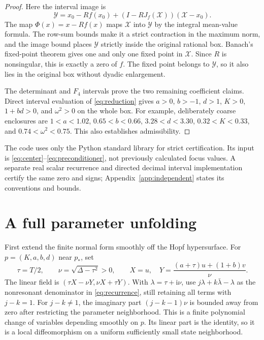 \documentclass[11pt,a4paper]{article}
\theoremstyle{remark}
\newcommand{\ii}{\mathrm i}
\numberwithin{equation}{section}
\begin{document}
\begin{proof}
Here the interval image is
\begin{equation}\label{eq:image}
 \mathcal Y=x_0-Rf(x_0)
                  +(I-RJ_f(\mathcal X))(\mathcal X-x_0).
\end{equation}
The map $\Phi(x)=x-Rf(x)$ maps $\mathcal X$ into $\mathcal Y$ by
the integral mean-value formula. The row-sum bounds make it a strict
contraction in the maximum norm, and the image bound places
$\mathcal Y$ strictly inside the original rational box. Banach's
fixed-point theorem gives one and only one fixed point in $\mathcal X$.
Since $R$ is nonsingular, this is exactly a zero of $f$. The fixed point
belongs to $\mathcal Y$, so it also lies in the original box without
dyadic enlargement.

The determinant and $F_4$ intervals prove the two remaining coefficient
claims. Direct interval evaluation of \eqref{eq:reduction} gives
$a>0$, $b>-1$, $d>1$, $K>0$, $1+bd>0$, and $\omega^2>0$ on the
whole box. For example, deliberately coarse enclosures are
$1<a<1.02$, $0.65<b<0.66$, $3.28<d<3.30$, $0.32<K<0.33$,
and $0.74<\omega^2<0.75$. This also establishes admissibility.
\end{proof}

The code uses only the Python standard library for strict certification.
Its input is \eqref{eq:center}--\eqref{eq:preconditioner}, not previously
calculated focus values. A separate real scalar recurrence and directed
decimal interval implementation certify the same zero and signs;
Appendix~\ref{app:independent} states its conventions and bounds.

\section{A full parameter unfolding}\label{sec:unfolding}
First extend the finite normal form smoothly off the Hopf hypersurface.
For $p=(K,a,b,d)$ near $p_*$, set
\begin{equation}\label{eq:offhopf}
 \tau=T/2,\qquad \nu=\sqrt{\Delta-\tau^2}>0,\qquad
 X=u,\quad Y=\frac{(a+\tau)u+(1+b)v}{\nu}.
\end{equation}
The linear field is $(\tau X-\nu Y,\nu X+\tau Y)$.
With $\lambda=\tau+\ii\nu$, use
$j\lambda+k\bar\lambda-\lambda$ as the nonresonant denominator in
\eqref{eq:recurrence}, still retaining all terms with $j-k=1$.
For $j-k\ne1$, the imaginary part $(j-k-1)\nu$ is bounded away
from zero after restricting the parameter neighborhood. This is a
finite polynomial change of variables depending smoothly on $p$.
Its linear part is the identity, so it is a local diffeomorphism on
a uniform sufficiently small state neighborhood.
\end{document}
